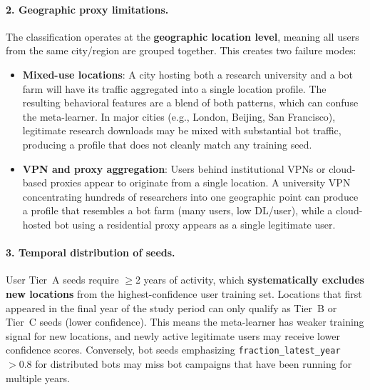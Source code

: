 \documentclass[11pt,a4paper]{article}
\begin{document}
\paragraph{2. Geographic proxy limitations.} The classification operates at the \textbf{geographic location level}, meaning all users from the same city/region are grouped together. This creates two failure modes:
\begin{itemize}
    \item \textbf{Mixed-use locations}: A city hosting both a research university and a bot farm will have its traffic aggregated into a single location profile. The resulting behavioral features are a blend of both patterns, which can confuse the meta-learner. In major cities (e.g., London, Beijing, San Francisco), legitimate research downloads may be mixed with substantial bot traffic, producing a profile that does not cleanly match any training seed.
    \item \textbf{VPN and proxy aggregation}: Users behind institutional VPNs or cloud-based proxies appear to originate from a single location. A university VPN concentrating hundreds of researchers into one geographic point can produce a profile that resembles a bot farm (many users, low DL/user), while a cloud-hosted bot using a residential proxy appears as a single legitimate user.
\end{itemize}

\paragraph{3. Temporal distribution of seeds.} User Tier~A seeds require $\geq$2 years of activity, which \textbf{systematically excludes new locations} from the highest-confidence user training set. Locations that first appeared in the final year of the study period can only qualify as Tier~B or Tier~C seeds (lower confidence). This means the meta-learner has weaker training signal for new locations, and newly active legitimate users may receive lower confidence scores. Conversely, bot seeds emphasizing \texttt{fraction\_latest\_year $> 0.8$} for distributed bots may miss bot campaigns that have been running for multiple years.
\end{document}
